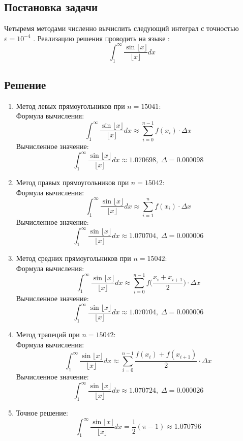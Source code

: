 \documentclass[a4paper, 14pt, titlepage, fleqn]{extarticle}
\begin{document}
		\subsection*{Постановка задачи}
			\noindent Четыремя методами численно вычислить следующий интеграл с точностью \(\varepsilon = 10^{-4}\) . Реализацию решения проводить на языке :
			\[\int_{1}^{\infty} \dfrac{\sin{\lfloor x \rfloor}}{\lfloor x \rfloor} dx\]
		\subsection*{Решение}
			\begin{enumerate}
				\item Метод левых  прямоугольников при \(n=15041\):\\
					Формула вычисления:
					\[ \int_{1}^{\infty} \dfrac{\sin{\lfloor x \rfloor}}{\lfloor x \rfloor} dx \approx \sum _{i=0} ^{n-1} f(x_i) \cdot \Delta x\]
					Вычисленное значение:
					\[ \int_{1}^{\infty} \dfrac{\sin{\lfloor x \rfloor}}{\lfloor x \rfloor} dx \approx 1.070698, \; \Delta = 0.000098\]
				\item Метод правых  прямоугольников  при \(n=15042\):\\
					Формула вычисления:
					\[ \int_{1}^{\infty} \dfrac{\sin{\lfloor x \rfloor}}{\lfloor x \rfloor} dx \approx \sum _{i=1} ^{n} f(x_i) \cdot \Delta x\]
					Вычисленное значение:
					\[ \int_{1}^{\infty} \dfrac{\sin{\lfloor x \rfloor}}{\lfloor x \rfloor} dx \approx 1.070704,  \; \Delta = 0.000006 \]
				\pagebreak
				\item Метод средних  прямоугольников  при \(n=15042\):\\
					Формула вычисления:
					\[ \int_{1}^{\infty} \dfrac{\sin{\lfloor x \rfloor}}{\lfloor x \rfloor} dx \approx \sum _{i=0} ^{n-1} f\bigg(\dfrac{x_i + x_{i+1}}{2}\bigg) \cdot \Delta x\]
					Вычисленное значение:
					\[ \int_{1}^{\infty} \dfrac{\sin{\lfloor x \rfloor}}{\lfloor x \rfloor} dx \approx 1.070704,  \; \Delta = 0.000006 \]
				\item Метод трапеций  при \(n=15042\):\\
					Формула вычисления:
					\[ \int_{1}^{\infty} \dfrac{\sin{\lfloor x \rfloor}}{\lfloor x \rfloor} dx \approx \sum _{i=0} ^{n-1} \dfrac {f(x_i) + f(x_{i+1})}{2} \cdot \Delta x\]
					Вычисленное значение:	
					\[ \int_{1}^{\infty} \dfrac{\sin{\lfloor x \rfloor}}{\lfloor x \rfloor} dx \approx 1.070724,  \; \Delta =0.000026 \]
				\item Точное решение:
					\[ \int_{1}^{\infty} \dfrac{\sin{\lfloor x \rfloor}}{\lfloor x \rfloor} dx = \dfrac{1}{2}(\pi - 1)  \approx 1.070796 \]
			\end{enumerate}
		\pagebreak
\end{document}
